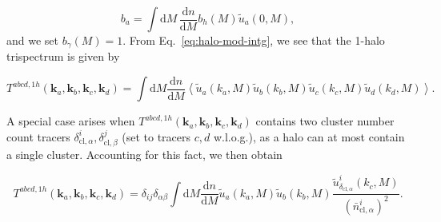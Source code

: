 \documentclass[%
 reprint,
nofootinbib,
 amsmath,amssymb,
 aps,
]{revtex4-1}
\begin{document}
\begin{equation}
b_{a} = \int \mathrm{d}M\,\frac{\mathrm{d}n}{\mathrm{d}M}b_{h}(M) \tilde{u}_{a}(0, M),
\end{equation}
and we set $b_{\gamma}(M) = 1$. From Eq.~\ref{eq:halo-mod-intg}, we see that the 1-halo trispectrum is given by
\begin{widetext}
\begin{equation}
T^{abcd, 1h}(\mathbf{k}_{a}, \mathbf{k}_{b}, \mathbf{k}_{c}, \mathbf{k}_{d}) = \int \mathrm{d}M \frac{\mathrm{d}n}{\mathrm{d}M} 
\left\langle \tilde{u}_{a}(k_{a}, M) \tilde{u}_{b}(k_{b}, M) \tilde{u}_{c}(k_{c}, M) \tilde{u}_{d}(k_{d}, M)\right\rangle.
\end{equation}
\end{widetext}
A special case arises when $T^{abcd, 1h}(\mathbf{k}_{a}, \mathbf{k}_{b}, \mathbf{k}_{c}, \mathbf{k}_{d})$ contains two cluster number count tracers $\delta_{\mathrm{cl}, \alpha}^{i}, \delta_{\mathrm{cl}, \beta}^{j}$ (set to tracers $c, d$ w.l.o.g.), as a halo can at most contain a single cluster. Accounting for this fact, we then obtain
\begin{widetext}
\begin{equation}
T^{abcd, 1h}(\mathbf{k}_{a}, \mathbf{k}_{b}, \mathbf{k}_{c}, \mathbf{k}_{d}) = \delta_{ij}\delta_{\alpha \beta} \int \mathrm{d}M \frac{\mathrm{d}n}{\mathrm{d}M} 
\tilde{u}_{a}(k_{a}, M) \tilde{u}_{b}(k_{b}, M) \frac{\tilde{u}^{i}_{\delta_{\mathrm{cl}, \alpha}}(k_{c}, M)}{(\bar{n}^{i}_{\mathrm{cl}, \alpha})^{2}}.
\end{equation}
\end{widetext}
\end{document}
